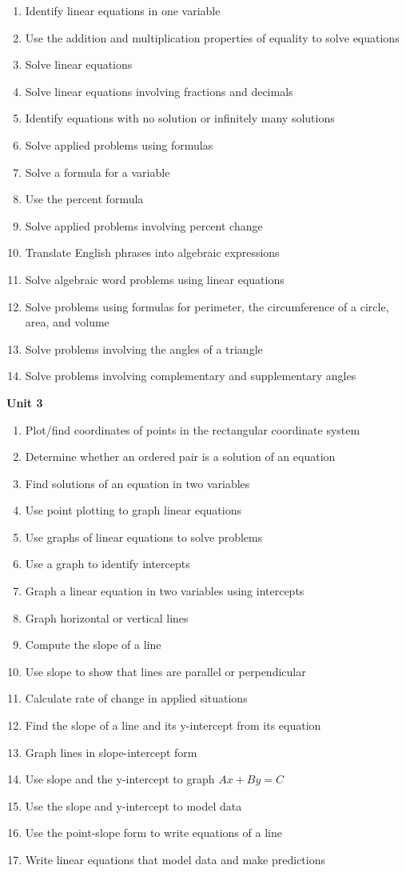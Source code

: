 \documentclass[11pt]{article}
\newenvironment{alphalist}{
\begin{enumerate}[label=(\arabic*),widest=107 ,leftmargin=25pt, itemsep=0pt]}
{\end{enumerate}}
\begin{document}
\begin{alphalist}
    \item Identify linear equations in one variable
    \item Use the addition and multiplication properties of equality to solve equations
    \item Solve linear equations
    \item Solve linear equations involving fractions and decimals
    \item Identify equations with no solution or infinitely many solutions
    \item Solve applied problems using formulas
    \item Solve a formula for a variable
    \item Use the percent formula
    \item Solve applied problems involving percent change
    \item Translate English phrases into algebraic expressions
    \item Solve algebraic word problems using linear equations
    \item Solve problems using formulas for perimeter, the circumference of a circle, area, and volume
    \item Solve problems involving the angles of a triangle
    \item Solve problems involving complementary and supplementary angles
\end{alphalist}
\noindent \textbf{Unit  3}
 \begin{alphalist}
    \item Plot/find coordinates of points in the rectangular coordinate system
    \item Determine whether an ordered pair is a solution of an equation
    \item Find solutions of an equation in two variables
    \item Use point plotting to graph linear equations
    \item Use graphs of linear equations to solve problems
    \item Use a graph to identify intercepts
    \item Graph a linear equation in two variables using intercepts
    \item Graph horizontal or vertical lines
    \item Compute the slope of a line
    \item Use slope to show that lines are parallel or perpendicular
    \item Calculate rate of change in applied situations
    \item Find the slope of a line and its y-intercept from its equation
    \item Graph lines in slope-intercept form
    \item Use slope and the y-intercept to graph $Ax + By = C$
    \item Use the slope and y-intercept to model data
    \item Use the point-slope form to write equations of a line
    \item Write linear equations that model data and make predictions
 \end{alphalist}
\end{document}
